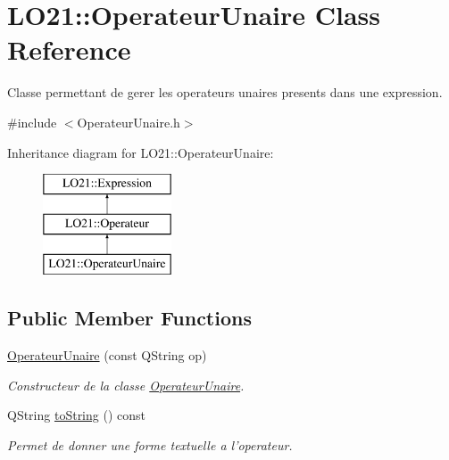 \hypertarget{class_l_o21_1_1_operateur_unaire}{\section{\-L\-O21\-:\-:\-Operateur\-Unaire \-Class \-Reference}
\label{class_l_o21_1_1_operateur_unaire}
}


\-Classe permettant de gerer les operateurs unaires presents dans une expression.  




{\ttfamily \#include $<$\-Operateur\-Unaire.\-h$>$}

\-Inheritance diagram for \-L\-O21\-:\-:\-Operateur\-Unaire\-:\begin{figure}[H]
\begin{center}
\leavevmode
\includegraphics[height=3.000000cm]{class_l_o21_1_1_operateur_unaire}
\end{center}
\end{figure}
\subsection*{\-Public \-Member \-Functions}
\begin{DoxyCompactItemize}
\item 
\hyperlink{class_l_o21_1_1_operateur_unaire_a883e5bfbdfa425834bcf8635bdc95954}{\-Operateur\-Unaire} (const \-Q\-String op)
\begin{DoxyCompactList}\small\item\em \-Constructeur de la classe \hyperlink{class_l_o21_1_1_operateur_unaire}{\-Operateur\-Unaire}. \end{DoxyCompactList}\item 
\-Q\-String \hyperlink{class_l_o21_1_1_operateur_unaire_a5b54c985de0fc559337f914771779185}{to\-String} () const 
\begin{DoxyCompactList}\small\item\em \-Permet de donner une forme textuelle a l'operateur. \end{DoxyCompactList}\end{DoxyCompactItemize}


